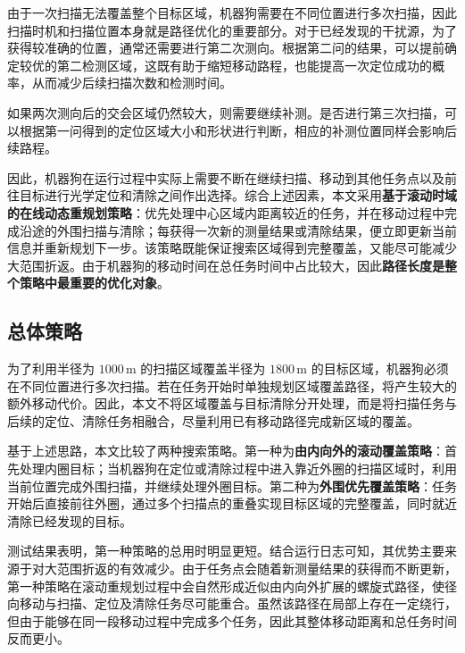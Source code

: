 \documentclass[withoutpreface,bwprint]{cumcmthesis}
\begin{document}
由于一次扫描无法覆盖整个目标区域，机器狗需要在不同位置进行多次扫描，因此扫描时机和扫描位置本身就是路径优化的重要部分。对于已经发现的干扰源，为了获得较准确的位置，通常还需要进行第二次测向。根据第二问的结果，可以提前确定较优的第二检测区域，这既有助于缩短移动路程，也能提高一次定位成功的概率，从而减少后续扫描次数和检测时间。

如果两次测向后的交会区域仍然较大，则需要继续补测。是否进行第三次扫描，可以根据第一问得到的定位区域大小和形状进行判断，相应的补测位置同样会影响后续路程。

因此，机器狗在运行过程中实际上需要不断在继续扫描、移动到其他任务点以及前往目标进行光学定位和清除之间作出选择。综合上述因素，本文采用\textbf{基于滚动时域的在线动态重规划策略}：优先处理中心区域内距离较近的任务，并在移动过程中完成沿途的外围扫描与清除；每获得一次新的测量结果或清除结果，便立即更新当前信息并重新规划下一步。该策略既能保证搜索区域得到完整覆盖，又能尽可能减少大范围折返。由于机器狗的移动时间在总任务时间中占比较大，因此\textbf{路径长度是整个策略中最重要的优化对象}。
\subsection{总体策略}
为了利用半径为 $1000\,\mathrm{m}$ 的扫描区域覆盖半径为 $1800\,\mathrm{m}$ 的目标区域，机器狗必须在不同位置进行多次扫描。若在任务开始时单独规划区域覆盖路径，将产生较大的额外移动代价。因此，本文不将区域覆盖与目标清除分开处理，而是将扫描任务与后续的定位、清除任务相融合，尽量利用已有移动路径完成新区域的覆盖。

基于上述思路，本文比较了两种搜索策略。第一种为\textbf{由内向外的滚动覆盖策略}：首先处理内圈目标；当机器狗在定位或清除过程中进入靠近外圈的扫描区域时，利用当前位置完成外围扫描，并继续处理外圈目标。第二种为\textbf{外围优先覆盖策略}：任务开始后直接前往外圈，通过多个扫描点的重叠实现目标区域的完整覆盖，同时就近清除已经发现的目标。

测试结果表明，第一种策略的总用时明显更短。结合运行日志可知，其优势主要来源于对大范围折返的有效减少。由于任务点会随着新测量结果的获得而不断更新，第一种策略在滚动重规划过程中会自然形成近似由内向外扩展的螺旋式路径，使径向移动与扫描、定位及清除任务尽可能重合。虽然该路径在局部上存在一定绕行，但由于能够在同一段移动过程中完成多个任务，因此其整体移动距离和总任务时间反而更小。
\end{document}
